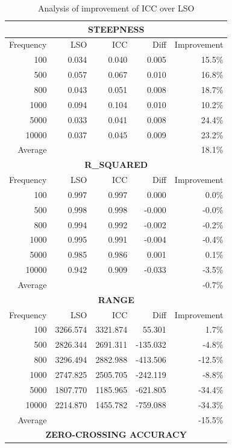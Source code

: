 \documentclass[11pt,a4paper]{article}
\begin{document}
\begin{table}[htbp]
\centering
\caption{Analysis of improvement of ICC over LSO}
\label{tab:lso-icc-fit}
\begin{tabular}{r|rrr|r}
\hline
\multicolumn{5}{c}{\textbf{STEEPNESS}} \\
\hline
Frequency & LSO & ICC & Diff & Improvement \\
\hline
100 & 0.034 & 0.040 & 0.005 & 15.5\% \\
500 & 0.057 & 0.067 & 0.010 & 16.8\% \\
800 & 0.043 & 0.051 & 0.008 & 18.7\% \\
1000 & 0.094 & 0.104 & 0.010 & 10.2\% \\
5000 & 0.033 & 0.041 & 0.008 & 24.4\% \\
10000 & 0.037 & 0.045 & 0.009 & 23.2\% \\
\hline
Average & & & & 18.1\% \\
\hline
\multicolumn{5}{c}{\textbf{R\_SQUARED}} \\
\hline
Frequency & LSO & ICC & Diff & Improvement \\
\hline
100 & 0.997 & 0.997 & 0.000 & 0.0\% \\
500 & 0.998 & 0.998 & -0.000 & -0.0\% \\
800 & 0.994 & 0.992 & -0.002 & -0.2\% \\
1000 & 0.995 & 0.991 & -0.004 & -0.4\% \\
5000 & 0.985 & 0.986 & 0.001 & 0.1\% \\
10000 & 0.942 & 0.909 & -0.033 & -3.5\% \\
\hline
Average & & & & -0.7\% \\
\hline
\multicolumn{5}{c}{\textbf{RANGE}} \\
\hline
Frequency & LSO & ICC & Diff & Improvement \\
\hline
100 & 3266.574 & 3321.874 & 55.301 & 1.7\% \\
500 & 2826.344 & 2691.311 & -135.032 & -4.8\% \\
800 & 3296.494 & 2882.988 & -413.506 & -12.5\% \\
1000 & 2747.825 & 2505.705 & -242.119 & -8.8\% \\
5000 & 1807.770 & 1185.965 & -621.805 & -34.4\% \\
10000 & 2214.870 & 1455.782 & -759.088 & -34.3\% \\
\hline
Average & & & & -15.5\% \\
\hline
\multicolumn{5}{c}{\textbf{ZERO-CROSSING ACCURACY}} \\

\end{tabular}
\end{table}
\end{document}
